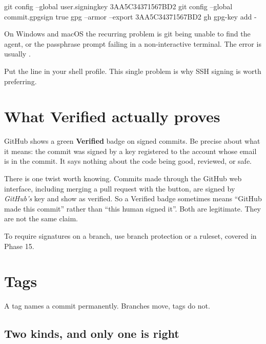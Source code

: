 \documentclass[11pt]{article}
\begin{document}
\begin{shell}
git config --global user.signingkey 3AA5C34371567BD2
git config --global commit.gpgsign true
gpg --armor --export 3AA5C34371567BD2
gh gpg-key add -
\end{shell}

\begin{trap}
On Windows and macOS the recurring problem is git being unable to find the agent, or
the passphrase prompt failing in a non-interactive terminal. The error is usually
.


Put the  line in your shell profile. This single problem is why SSH
signing is worth preferring.
\end{trap}

\section{What Verified actually proves}

GitHub shows a green \textbf{Verified} badge on signed commits. Be precise about
what it means: the commit was signed by a key registered to the account whose email
is in the commit. It says nothing about the code being good, reviewed, or safe.

\begin{note}
There is one twist worth knowing. Commits made through the GitHub web interface,
including merging a pull request with the button, are signed by \emph{GitHub's} key
and show as verified. So a Verified badge sometimes means ``GitHub made this
commit'' rather than ``this human signed it''. Both are legitimate. They are not the
same claim.
\end{note}

To require signatures on a branch, use branch protection or a ruleset, covered in
Phase 15.

\section{Tags}

A tag names a commit permanently. Branches move, tags do not.

\subsection{Two kinds, and only one is right}
\end{document}

